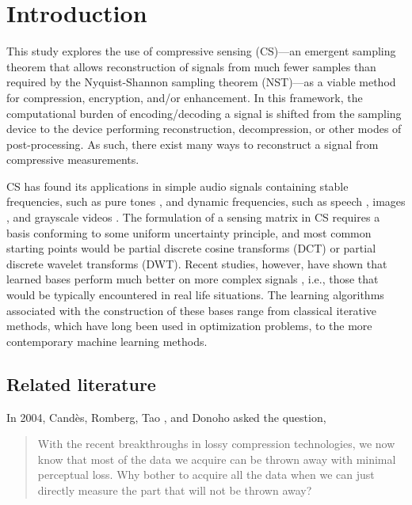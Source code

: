 \chapter{Introduction}
\label{chap:intro}

This study explores the use of compressive sensing (CS)---an emergent sampling theorem that allows reconstruction of signals from much fewer samples than required by the Nyquist-Shannon sampling theorem (NST)---as a viable method for compression, encryption, and/or enhancement. In this framework, the computational burden of encoding/decoding a signal is shifted from the sampling device to the device performing reconstruction, decompression, or other modes of post-processing. As such, there exist many ways to reconstruct a signal from compressive measurements. 

CS has found its applications in simple audio signals containing stable frequencies, such as pure tones \cite{Mathew2016,Andras2018}, and dynamic frequencies, such as speech \cite{Low2013,Low2018,Abrol2015}, images \cite{Mo2013,Zhou2016,Romero2016}, and grayscale videos \cite{Liu2014,Chen2014}. The formulation of a sensing matrix in CS requires a basis conforming to some uniform uncertainty principle, and most common starting points would be partial discrete cosine transforms (DCT) or partial discrete wavelet transforms (DWT). Recent studies, however, have shown that learned bases perform much better on more complex signals \cite{Liu2013,Sharma2018,Eslahi2016}, i.e., those that would be typically encountered in real life situations. The learning algorithms associated with the construction of these bases range from classical iterative methods, which have long been used in optimization problems, to the more contemporary machine learning methods.


\section{Related literature}
\label{sec:rrl}
In 2004, Cand\`{e}s, Romberg, Tao \cite{Candes2006}, and Donoho \cite{Donoho2006} asked the question, 

\begin{quote}
	With the recent breakthroughs in lossy compression technologies, we now know that most of the data we acquire can be thrown away with minimal perceptual loss. Why bother to acquire all the data when we can just directly measure the part that will not be thrown away?
\end{quote}

